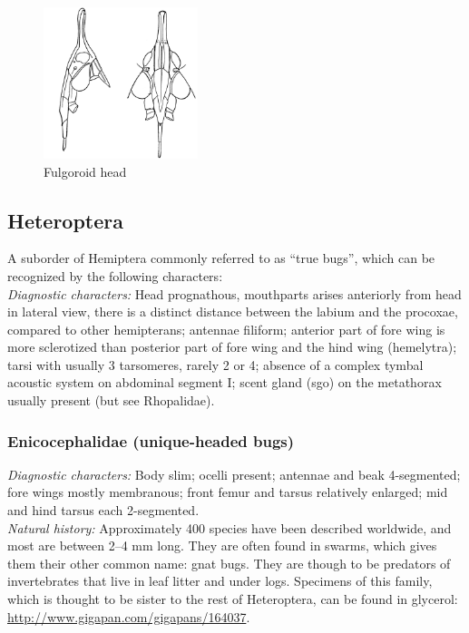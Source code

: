 \documentclass[letterpaper, 11pt]{article}
\begin{document}
\begin{figure}[ht!]
 \centering
 \includegraphics[width=0.4\textwidth]{fulgoroidHead.png}
 \caption{Fulgoroid head \citep[Modified from][Fig. 2]{britton1923hemiptera}}
 \label{fig:fulgoroidHead}
\end{figure}

\clearpage
\subsection{Heteroptera}
A suborder of Hemiptera commonly referred to as ``true bugs'', which can be recognized by the following characters:\\

\noindent{}\textit{Diagnostic characters:} Head prognathous, mouthparts arises anteriorly from head in lateral view, there is a distinct distance between the labium and the procoxae, compared to other hemipterans; antennae filiform; anterior part of fore wing is more sclerotized than posterior part of fore wing and the hind wing (hemelytra); tarsi with usually 3 tarsomeres, rarely 2 or 4; absence of a complex tymbal acoustic system on abdominal segment I; scent gland (sgo) on the metathorax usually present (but see Rhopalidae).

\subsubsection{Enicocephalidae (unique-headed bugs)}
\noindent{}\textit{Diagnostic characters:} Body slim; ocelli present; antennae and beak 4-segmented; fore wings mostly membranous; front femur and tarsus relatively enlarged; mid and hind tarsus each 2-segmented.\\

\noindent{}\textit{Natural history:} Approximately 400 species have been described worldwide, and most are between 2--4 mm long. They are often found in swarms, which gives them their other common name: gnat bugs. They are though to be predators of invertebrates that live in leaf litter and under logs. Specimens of this family, which is thought to be sister to the rest of Heteroptera, can be found in glycerol: \url{http://www.gigapan.com/gigapans/164037}. \\
\end{document}
